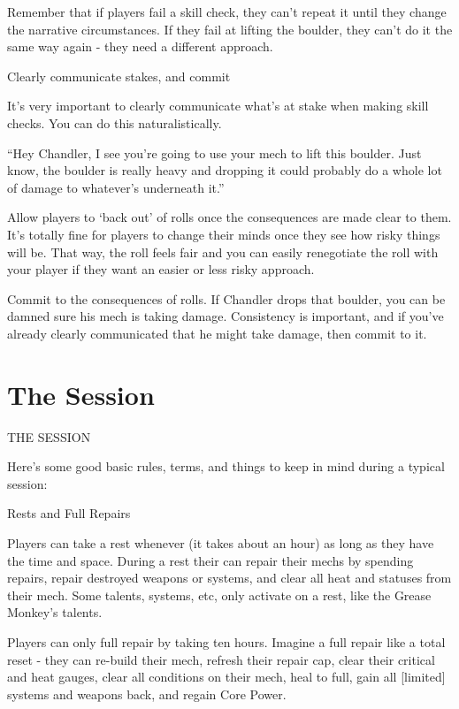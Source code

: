 Remember that if players fail a skill check, they can’t repeat it until they change the
narrative circumstances. If they fail at lifting the boulder, they can’t do it the same way again -
they need a different approach.


                              Clearly communicate stakes, and commit


It’s very important to clearly communicate what’s at stake when making skill checks. You can
do this naturalistically.

	        “Hey Chandler, I see you’re going to use your mech to lift this boulder. Just know, the
boulder is really heavy and dropping it could probably do a whole lot of damage to whatever’s
underneath it.”





Allow players to ‘back out’ of rolls once the consequences are made clear to them. It’s totally
fine for players to change their minds once they see how risky things will be. That way, the roll
feels fair and you can easily renegotiate the roll with your player if they want an easier or less
risky approach.


Commit to the consequences of rolls. If Chandler drops that boulder, you can be damned sure
his mech is taking damage. Consistency is important, and if you’ve already clearly
communicated that he might take damage, then commit to it.

\chapter{The Session}
                                            THE SESSION

Here’s some good basic rules, terms, and things to keep in mind during a typical session:


                                         Rests and Full Repairs


Players can take a rest whenever (it takes about an hour) as long as they have the time and
space. During a rest their can repair their mechs by spending repairs, repair destroyed weapons
or systems, and clear all heat and statuses from their mech. Some talents, systems, etc, only
activate on a rest, like the Grease Monkey’s talents.


Players can only full repair by taking ten hours. Imagine a full repair like a total reset - they can
re-build their mech, refresh their repair cap, clear their critical and heat gauges, clear all
conditions on their mech, heal to full, gain all [limited] systems and weapons back, and regain
Core Power.


